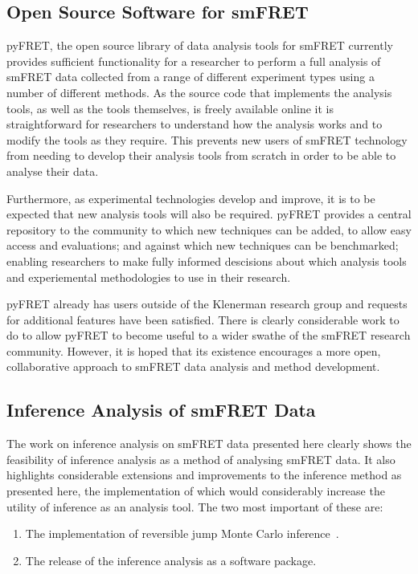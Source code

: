 \subsection{Open Source Software for smFRET}
pyFRET, the open source library of data analysis tools for smFRET currently provides sufficient functionality for a researcher to perform a full analysis of smFRET data collected from a range of different experiment types using a number of different methods. As the source code that implements the analysis tools, as well as the tools themselves, is freely available online it is straightforward for researchers to understand how the analysis works and to modify the tools as they require. This prevents new users of smFRET technology from needing to develop their analysis tools from scratch in order to be able to analyse their data. 

Furthermore, as experimental technologies develop and improve, it is to be expected that new analysis tools will also be required. pyFRET provides a central repository to the community to which new techniques can be added, to allow easy access and evaluations; and against which new techniques can be benchmarked; enabling researchers to make fully informed descisions about which analysis tools and experiemental methodologies to use in their research.

pyFRET already has users outside of the Klenerman research group and requests for additional features have been satisfied. There is clearly considerable work to do to allow pyFRET to become useful to a wider swathe of the smFRET research community. However, it is hoped that its existence encourages a more open, collaborative approach to smFRET data analysis and method development. 

\subsection{Inference Analysis of smFRET Data}
The work on inference analysis on smFRET data presented here clearly shows the feasibility of inference analysis as a method of analysing smFRET data. It also highlights considerable extensions and improvements to the inference method as presented here, the implementation of which would considerably increase the utility of inference as an analysis tool. The two most important of these are:

\begin{enumerate}
\item The implementation of reversible jump Monte Carlo inference~\cite{green1995}.
\item The release of the inference analysis as a software package.
\end{enumerate}


